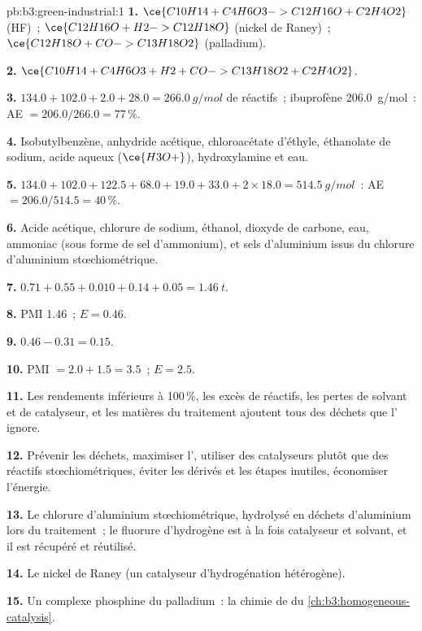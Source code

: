\begin{solution}{pb:b3:green-industrial:1}
\textbf{1.} $\ce{C10H14 + C4H6O3 -> C12H16O + C2H4O2}$ (HF)~; $\ce{C12H16O + H2 -> C12H18O}$ (nickel de Raney)~;
$\ce{C12H18O + CO -> C13H18O2}$ (palladium).

\textbf{2.} $\ce{C10H14 + C4H6O3 + H2 + CO -> C13H18O2 + C2H4O2}$.

\textbf{3.} $134.0 + 102.0 + 2.0 + 28.0 = \qty{266.0}{g/mol}$ de réactifs~; ibuprofène \qty{206.0}{g/mol}~: AE $= 206.0/266.0 = 77$\,\%.

\textbf{4.} Isobutylbenzène, anhydride acétique, chloroacétate d'éthyle,
éthanolate de sodium, acide aqueux ($\ce{H3O+}$), hydroxylamine et eau.

\textbf{5.} $134.0 + 102.0 + 122.5 + 68.0 + 19.0 + 33.0 + 2 \times 18.0 = \qty{514.5}{g/mol}$~: AE $= 206.0/514.5 = 40$\,\%.

\textbf{6.} Acide acétique, chlorure de sodium, éthanol, dioxyde de carbone,
eau, ammoniac (sous forme de sel d'ammonium), et sels d'aluminium issus du
chlorure d'aluminium stœchiométrique.

\textbf{7.} $0.71 + 0.55 + 0.010 + 0.14 + 0.05 = \qty{1.46}{t}$.

\textbf{8.} PMI 1.46~; $E = 0.46$.

\textbf{9.} $0.46 - 0.31 = 0.15$.

\textbf{10.} PMI $= 2.0 + 1.5 = 3.5$~; $E = 2.5$.

\textbf{11.} Les rendements inférieurs à 100\,\%, les excès de réactifs, les
pertes de solvant et de catalyseur, et les matières du traitement ajoutent
tous des déchets que l' ignore.

\textbf{12.} Prévenir les déchets, maximiser l', utiliser
des catalyseurs plutôt que des réactifs stœchiométriques, éviter les
dérivés et les étapes inutiles, économiser l'énergie.

\textbf{13.} Le chlorure d'aluminium stœchiométrique, hydrolysé en déchets
d'aluminium lors du traitement~; le fluorure d'hydrogène est à la fois
catalyseur et solvant, et il est récupéré et réutilisé.

\textbf{14.} Le nickel de Raney (un catalyseur d'hydrogénation hétérogène).

\textbf{15.} Un complexe phosphine du palladium~: la chimie de  du
\cref{ch:b3:homogeneous-catalysis}.


\end{solution}
